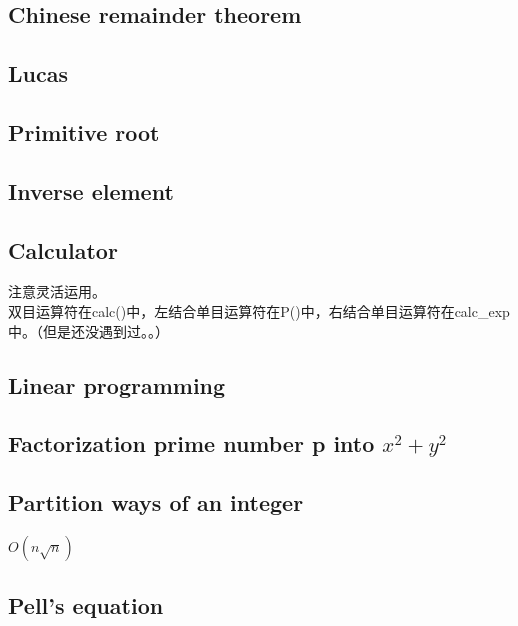 \subsection{Chinese remainder theorem}


\subsection{Lucas}


\subsection{Primitive root}

\subsection{Inverse element}


\subsection{Calculator}
注意灵活运用。\\
双目运算符在calc()中，左结合单目运算符在P()中，右结合单目运算符在calc\_exp中。（但是还没遇到过。。）\\


\subsection{Linear programming}


\subsection{Factorization prime number p into $x^2+y^2$}


\subsection{Partition ways of an integer}
$O(n\sqrt{n})$


\subsection{Pell's equation}


